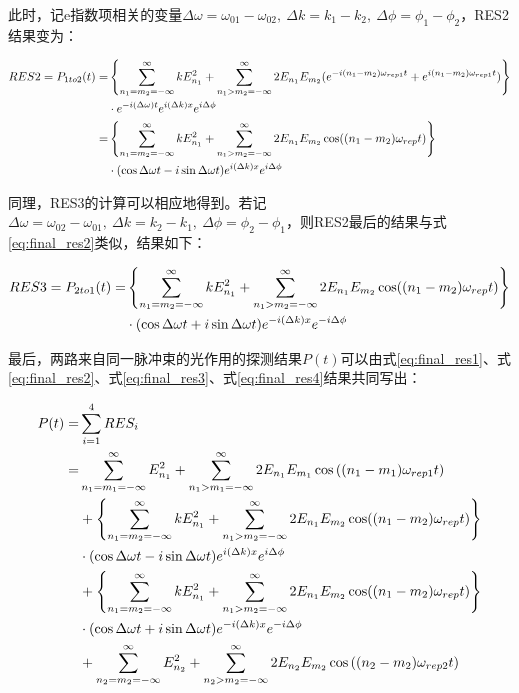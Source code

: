 此时，记e指数项相关的变量$\Delta\omega=\omega_{01}-\omega_{02},\ \Delta k=k_1-k_2,\ \Delta\phi=\phi_1-\phi_2$，RES2结果变为：
\begin{footnotesize}
\begin{align}
    RES2=P_{1to2}(t)=&\left\{\sum_{n_1=m_2=-\infty}^{\infty}kE_{n_1}^2+\sum_{n_1>m_2=-\infty}^{\infty}2E_{n_1}E_{m_2}(e^{-i(n_1-m_2)\omega_{rep1}t}+e^{i(n_1-m_2)\omega_{rep1}t})\right\}\\
    & \cdot e^{-i(\Delta\omega)t}e^{i(\Delta k)x}e^{i\Delta\phi}\\
    =&\left\{\sum_{n_1=m_2=-\infty}^{\infty}kE_{n_1}^2+\sum_{n_1>m_2=-\infty}^{\infty}2E_{n_1}E_{m_2}\cos((n_1-m_2)\omega_{rep}t)\right\}\notag\\
    & \cdot (\cos\Delta\omega t-i\sin\Delta\omega t)e^{i(\Delta k)x}e^{i\Delta\phi}\label{eq:final_res2}
\end{align}
\end{footnotesize}

同理，RES3的计算可以相应地得到。若记$\Delta\omega=\omega_{02}-\omega_{01},\ \Delta k=k_2-k_1,\ \Delta\phi=\phi_2-\phi_1$，则RES2最后的结果与式\eqref{eq:final_res2}类似，结果如下：
\begin{small}
\begin{align}
    RES3=P_{2to1}(t)=&\left\{\sum_{n_1=m_2=-\infty}^{\infty}kE_{n_1}^2+\sum_{n_1>m_2=-\infty}^{\infty}2E_{n_1}E_{m_2}\cos((n_1-m_2)\omega_{rep}t)\right\}\notag\\
    & \cdot (\cos\Delta\omega t+i\sin\Delta\omega t)e^{-i(\Delta k)x}e^{-i\Delta\phi}\label{eq:final_res3}
\end{align}    
\end{small}

最后，两路来自同一脉冲束的光作用的探测结果$P(t)$可以由式\eqref{eq:final_res1}、式\eqref{eq:final_res2}、式\eqref{eq:final_res3}、式\eqref{eq:final_res4}结果共同写出：
\begin{small}
\begin{align}
    P(t)=&\sum_{i=1}^{4}RES_i\\
    =&\sum_{n_1=m_1=-\infty}^{\infty}E_{n_1}^2 + \sum_{n_1>m_1=-\infty}^{\infty}2E_{n_1} E_{m_1} \cos\left((n_1-m_1)\omega_{rep1}t\right)\\
    &+\left\{\sum_{n_1=m_2=-\infty}^{\infty}kE_{n_1}^2+\sum_{n_1>m_2=-\infty}^{\infty}2E_{n_1}E_{m_2}\cos((n_1-m_2)\omega_{rep}t)\right\}\notag\\
    & \cdot (\cos\Delta\omega t-i\sin\Delta\omega t)e^{i(\Delta k)x}e^{i\Delta\phi}\\
    &+\left\{\sum_{n_1=m_2=-\infty}^{\infty}kE_{n_1}^2+\sum_{n_1>m_2=-\infty}^{\infty}2E_{n_1}E_{m_2}\cos((n_1-m_2)\omega_{rep}t)\right\}\notag\\
    & \cdot (\cos\Delta\omega t+i\sin\Delta\omega t)e^{-i(\Delta k)x}e^{-i\Delta\phi}\\
    &+\sum_{n_2=m_2=-\infty}^{\infty}E_{n_2}^2 + \sum_{n_2>m_2=-\infty}^{\infty}2E_{n_2} E_{m_2} \cos\left((n_2-m_2)\omega_{rep2}t\right)
\end{align}
\end{small}

